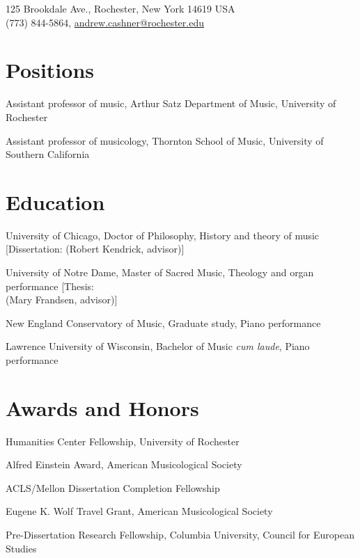 \documentclass{neh-resume}
\begin{document}

\begin{cvAddress}
125 Brookdale Ave., Rochester, New York 14619 USA \\
(773) 844-5864, \url{andrew.cashner@rochester.edu}
\end{cvAddress}

\section{Positions}
{Assistant professor of music,
Arthur Satz Department of Music, University of Rochester}

{Assistant professor of musicology,
Thornton School of Music, University of Southern California}

\section{Education}
{University of Chicago,
Doctor of Philosophy, History and theory of music}
[Dissertation:  (Robert Kendrick, advisor)]

{University of Notre Dame,
Master of Sacred Music, Theology and organ performance}
[Thesis:  \\ (Mary Frandsen, advisor)]

{New England Conservatory of Music,
Graduate study, Piano performance}

{Lawrence University of Wisconsin,
Bachelor of Music \emph{cum laude}, Piano performance}

\section{Awards and Honors}
{Humanities Center Fellowship, University of Rochester}

{Alfred Einstein Award, American Musicological Society}

{ACLS/Mellon Dissertation Completion Fellowship}

{Eugene K. Wolf Travel Grant, American Musicological Society}

{Pre-Dissertation Research Fellowship, Columbia University, Council for
European Studies}
\end{document}
